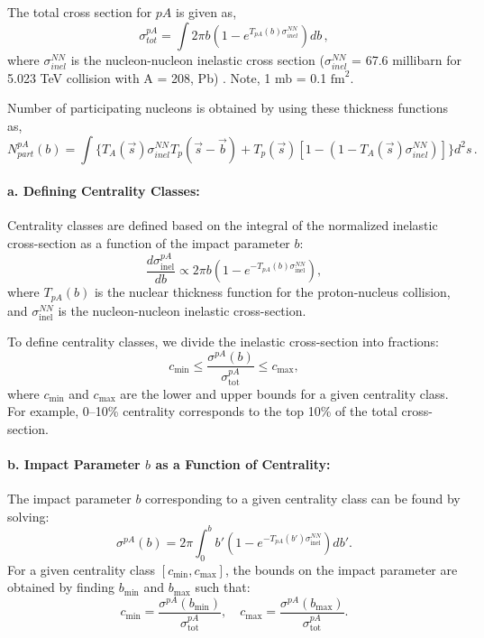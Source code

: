 \documentclass[11pt,onecolumn]{article}
\newcommand{\beq}{\begin{equation}}
\newcommand{\eeq}{\end{equation}}
\begin{document}
The total cross section for $pA$ is given as,
\beq
\sigma^{pA}_{tot} =\int  2 \pi b  (1-e^{T_{pA} (b) \sigma^{NN}_{inel}}) db \, ,
\eeq
where $\sigma^{NN}_{inel}$ is the nucleon-nucleon inelastic cross section ($\sigma^{NN}_{inel}$ = 67.6 millibarn for 5.023 TeV collision with A = 208, Pb) \cite{Loizides:2017ack}. Note, 1 mb = 0.1 $\text{fm}^2$.


Number of participating nucleons is obtained by using these thickness functions as,
\beq
N^{pA}_{part}(b) = \int \{T_A(\vec{s}) \sigma^{NN}_{inel} T_p(\vec{s}-\vec{b}) + T_p(\vec{s})[1-(1-T_A(\vec{s})\sigma^{NN}_{inel})]\} d^2s \, .
\eeq


\paragraph{a. Defining Centrality Classes:}
Centrality classes are defined based on the integral of the normalized inelastic cross-section as a function of the impact parameter \( b \):
\[
\frac{d\sigma_{\text{inel}}^{pA}}{db} \propto 2 \pi b \left( 1 - e^{-T_{pA}(b) \sigma^{NN}_{\text{inel}}} \right),
\]
where \( T_{pA}(b) \) is the nuclear thickness function for the proton-nucleus collision, and \( \sigma^{NN}_{\text{inel}} \) is the nucleon-nucleon inelastic cross-section.

To define centrality classes, we divide the inelastic cross-section into fractions:
\[
c_{\text{min}} \leq \frac{\sigma^{pA}(b)}{\sigma^{pA}_{\text{tot}}} \leq c_{\text{max}},
\]
where \( c_{\text{min}} \) and \( c_{\text{max}} \) are the lower and upper bounds for a given centrality class. For example, 0–10\% centrality corresponds to the top 10\% of the total cross-section.
\paragraph{b. Impact Parameter \( b \) as a Function of Centrality:}
The impact parameter \( b \) corresponding to a given centrality class can be found by solving:
\[
\sigma^{pA}(b) = 2 \pi \int_0^b b' \left( 1 - e^{-T_{pA}(b') \sigma^{NN}_{\text{inel}}} \right) db'.
\]
For a given centrality class \( [c_{\text{min}}, c_{\text{max}}] \), the bounds on the impact parameter are obtained by finding \( b_{\text{min}} \) and \( b_{\text{max}} \) such that:
\[
c_{\text{min}} = \frac{\sigma^{pA}(b_{\text{min}})}{\sigma^{pA}_{\text{tot}}},
\quad
c_{\text{max}} = \frac{\sigma^{pA}(b_{\text{max}})}{\sigma^{pA}_{\text{tot}}}.
\]
\end{document}
